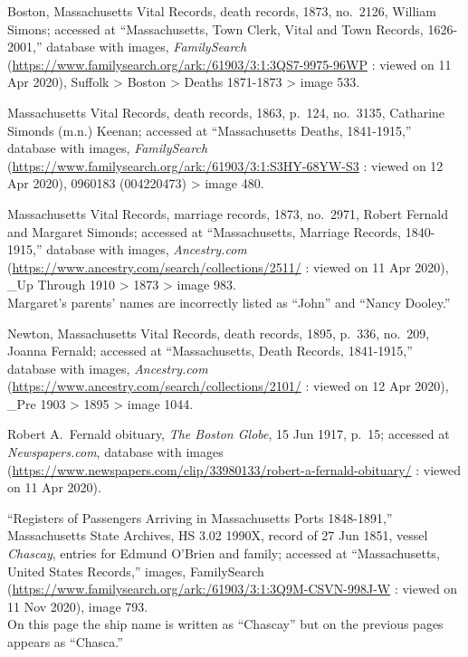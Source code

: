 \begin{thebibliography}{999}
Boston, Massachusetts Vital Records, death records, 1873, no.\ 2126, William Simons; accessed at ``Massachusetts, Town Clerk, Vital and Town Records, 1626-2001,'' database with images, \textit{FamilySearch} (\url{https://www.familysearch.org/ark:/61903/3:1:3QS7-9975-96WP} : viewed on 11 Apr 2020), Suffolk > Boston > Deaths 1871-1873 > image 533.

Massachusetts Vital Records, death records, 1863, p.\ 124, no.\ 3135, Catharine Simonds (m.n.) Keenan; accessed at ``Massachusetts Deaths, 1841-1915,'' database with images, \textit{FamilySearch} (\url{https://www.familysearch.org/ark:/61903/3:1:S3HY-68YW-S3} : viewed on 12 Apr 2020), 0960183 (004220473) > image 480.

Massachusetts Vital Records, marriage records, 1873, no.\ 2971, Robert Fernald and Margaret Simonds; accessed at ``Massachusetts, Marriage Records, 1840-1915,'' database with images, \textit{Ancestry.com} (\url{https://www.ancestry.com/search/collections/2511/} : viewed on 11 Apr 2020), \_Up Through 1910 > 1873 > image 983.\\
Margaret's parents' names are incorrectly listed as ``John'' and ``Nancy Dooley.''

Newton, Massachusetts Vital Records, death records, 1895, p.\ 336, no.\ 209, Joanna Fernald; accessed at ``Massachusetts, Death Records, 1841-1915,'' database with images, \textit{Ancestry.com} (\url{https://www.ancestry.com/search/collections/2101/} : viewed on 12 Apr 2020), \_Pre 1903 > 1895 > image 1044.

Robert A.\ Fernald obituary, \textit{The Boston Globe}, 15 Jun 1917, p.\ 15; accessed at \textit{Newspapers.com}, database with images (\url{https://www.newspapers.com/clip/33980133/robert-a-fernald-obituary/} : viewed on 11 Apr 2020).

``Registers of Passengers Arriving in Massachusetts Ports 1848-1891,'' Massachusetts State Archives, HS 3.02 1990X, record of 27 Jun 1851, vessel \textit{Chascay}, entries for Edmund O'Brien and family; accessed at ``Massachusetts, United States Records,'' images, FamilySearch (\url{https://www.familysearch.org/ark:/61903/3:1:3Q9M-CSVN-998J-W} : viewed on 11 Nov 2020), image 793.\\
On this page the ship name is written as ``Chascay'' but on the previous pages appears as ``Chasca.''


\end{thebibliography}
